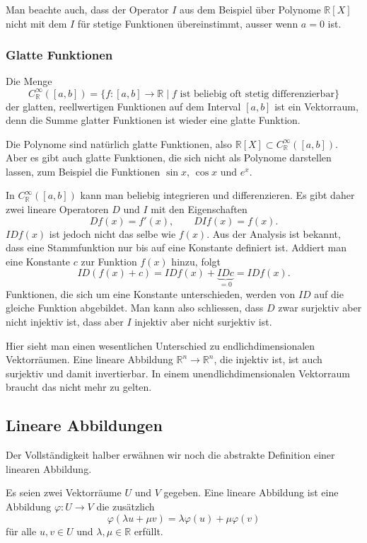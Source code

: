 Man beachte auch, dass der Operator $I$ aus dem Beispiel über Polynome
$\mathbb R[X]$ nicht mit dem $I$ für stetige Funktionen übereinstimmt,
ausser wenn $a=0$ ist.

\subsubsection{Glatte Funktionen}
Die Menge
\[
C^{\infty}_{\mathbb R}([a,b])
=
\{ f\colon [a,b]\to\mathbb R\;|\;
\text{$f$ ist beliebig oft stetig differenzierbar}\}
\]
der glatten, reellwertigen Funktionen auf dem Interval $[a,b]$
ist ein Vektorraum, denn die Summe glatter Funktionen ist wieder
eine glatte Funktion.

Die Polynome sind natürlich glatte Funktionen, also
$\mathbb R[X]\subset C^{\infty}_{\mathbb R}([a,b])$.
Aber es gibt auch glatte Funktionen, die sich nicht als Polynome
darstellen lassen, zum Beispiel die Funktionen
$\sin x$, $\cos x$ und $e^x$.

In $C^{\infty}_{\mathbb R}([a,b])$ kann man beliebig integrieren und
differenzieren.
Es gibt daher zwei lineare Operatoren $D$ und $I$ mit den Eigenschaften
\[
Df(x) = f'(x),
\qquad
DIf(x) = f(x).
\]
$IDf(x)$ ist jedoch nicht das selbe wie $f(x)$.
Aus der Analysis ist bekannt, dass eine Stammfunktion nur bis auf
eine Konstante definiert ist.
Addiert man eine Konstante $c$ zur Funktion $f(x)$ hinzu, folgt
\[
ID(f(x)+c) = IDf(x) + \underbrace{IDc}_{\displaystyle=0} =  IDf(x).
\]
Funktionen, die sich um eine Konstante unterschieden, werden von $ID$ auf
die gleiche Funktion abgebildet.
Man kann also schliessen, dass $D$ zwar surjektiv aber nicht injektiv ist,
dass aber $I$ injektiv aber nicht surjektiv ist.

Hier sieht man einen wesentlichen Unterschied zu endlichdimensionalen
Vektorräumen.
Eine lineare Abbildung $\mathbb R^n\to\mathbb R^n$, die injektiv ist, ist
auch surjektiv und damit invertierbar.
In einem unendlichdimensionalen Vektorraum braucht das nicht mehr zu
gelten.


%
%
\subsection{Lineare Abbildungen}
Der Vollständigkeit halber erwähnen wir noch die abstrakte Definition
einer linearen Abbildung.

\begin{definition}
Es seien zwei Vektorräume $U$ und $V$ gegeben.
Eine lineare Abbildung ist eine Abbildung
$\varphi\colon U\to V$ die zusätzlich
\begin{equation}
\varphi(\lambda u+\mu v) = \lambda \varphi(u) + \mu \varphi(v)
\label{skript:linabb:def:linkomb}
\end{equation}
für alle $u,v\in U$ und $\lambda,\mu\in\mathbb R$ erfüllt.
\end{definition}

